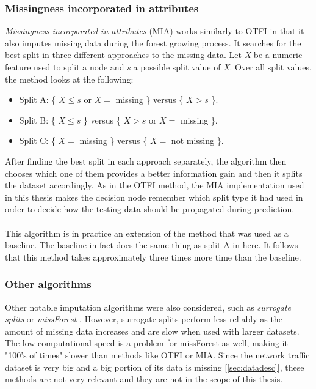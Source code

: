 \documentclass[11pt]{article}
\begin{document}
      \subsubsection{Missingness incorporated in attributes}
        \label{sec:mia}
        {\it Missingness incorporated in attributes} \cite{mia} (MIA) works similarly to OTFI in that it also imputes missing data during the forest growing process. It searches for the best split in three different approaches to the missing data. Let {\it X} be a numeric feature used to split a node and {\it s} a possible split value of {\it X}. Over all split values, the method looks at the following:
        \begin{itemize}
        \item Split A: \{ $X \leq s$ or $X =$ missing \} versus \{ $X > s$ \}.
        \item Split B: \{ $X \leq s$ \} versus \{ $X > s$ or $X =$ missing \}.
        \item Split C: \{ $X =$ missing \} versus \{ $X =$ not missing \}.
        \end{itemize}
        After finding the best split in each approach separately, the algorithm then chooses which one of them provides a better information gain and then it splits the dataset accordingly. As in the OTFI method, the MIA implementation used in this thesis makes the decision node remember which split type it had used in order to decide how the testing data should be propagated during prediction.
        \\~\\
        This algorithm is in practice an extension of the method that was used as a baseline. The baseline in fact does the same thing as split A in here. It follows that this method takes approximately three times more time than the baseline.
      \subsubsection{Other algorithms}
        Other notable imputation algorithms were also considered, such as {\it surrogate splits} \cite{splits} or {\it missForest} \cite{otfi}. However, surrogate splits perform less reliably as the amount of missing data increases \cite{splits} and are slow when used with larger datasets. \cite{rsf} The low computational speed is a problem for missForest as well, making it "100's of times" slower than methods like OTFI or MIA. \cite{otfi} Since the network traffic dataset is very big and a big portion of its data is missing [\ref{sec:datadesc}], these methods are not very relevant and they are not in the scope of this thesis.
  \newpage
\end{document}
